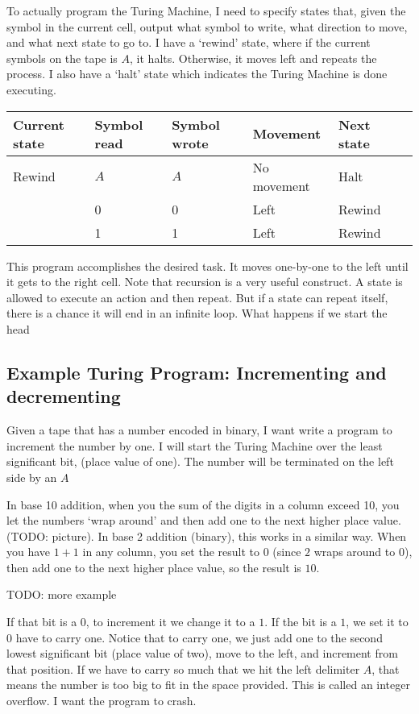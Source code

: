 \documentclass[11pt, letterpaper, twoside, openright]{book}
\begin{document}
To actually program the Turing Machine, I need to specify states that, given the symbol in the current cell, output what symbol to write, what direction to move, and what next state to go to. I have a `rewind' state, where if the current symbols on the tape is $A$, it halts. Otherwise, it moves left and repeats the process. I also have a `halt' state which indicates the Turing Machine is done executing.

\begin{tabular}{|l|l|l|l|l|l|}
\hline
Current state & Symbol read & Symbol wrote & Movement & Next state \\
\hline
Rewind & $A$ & $A$ & No movement & Halt \\
 & 0 & 0 & Left & Rewind \\
 & 1 & 1 & Left & Rewind \\
\hline
\end{tabular}

This program accomplishes the desired task. It moves one-by-one to the left until it gets to the right cell. Note that recursion is a very useful construct. A state is allowed to execute an action and then repeat. But if a state can repeat itself, there is a chance it will end in an infinite loop. What happens if we start the head

\subsection{Example Turing Program: Incrementing and decrementing}
Given a tape that has a number encoded in binary, I want write a program to increment the number by one. I will start the Turing Machine over the least significant bit, (place value of one). The number will be terminated on the left side by an $A$

In base 10 addition, when you the sum of the digits in a column exceed 10, you let the numbers `wrap around' and then add one to the next higher place value. (TODO: picture). In base 2 addition (binary), this works in a similar way. When you have $1 + 1$ in any column, you set the result to $0$ (since $2$ wraps around to $0$), then add one to the next higher place value, so the result is $10$.

TODO: more example

If that bit is a $0$, to increment it we change it to a $1$. If the bit is a $1$, we set it to $0$ have to carry one. Notice that to carry one, we just add one to the second lowest significant bit (place value of two), move to the left, and increment from that position. If we have to carry so much that we hit the left delimiter $A$, that means the number is too big to fit in the space provided. This is called an integer overflow. I want the program to crash.
\end{document}
